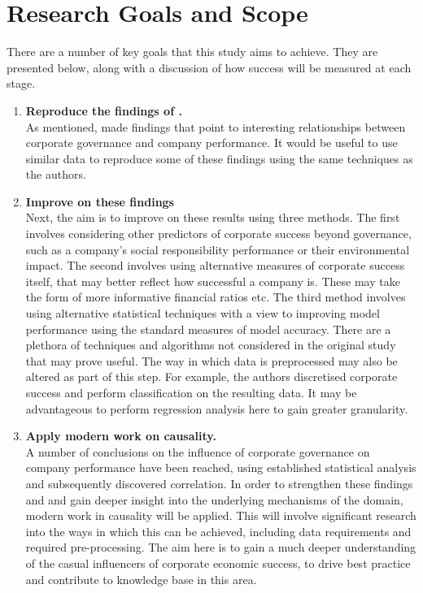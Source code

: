\section{Research Goals and Scope}{\label{RGAS}}
{There are a number of key goals that this study aims to achieve. They are presented below, along with a discussion of how success will be measured at each stage.
\begin{enumerate}
\item{\bf {Reproduce the findings of \cite{moldovan2015learning}}.}\\
{As mentioned, \cite{moldovan2015learning} made findings that point to interesting relationships between corporate governance and company performance. It would be useful to use similar data to reproduce some of these findings using the same techniques as the authors.}
\item{\bf {Improve on these findings}}\\
Next, the aim is to improve on these results using three methods. The first involves considering other predictors of corporate success beyond governance, such as a company's social responsibility performance or their environmental impact. The second involves using alternative measures of corporate success itself, that may better reflect how successful a company is. These may take the form of more informative financial ratios etc. The third method involves using alternative statistical techniques with a view to improving model performance using the standard measures of model accuracy. There are a plethora of techniques and algorithms not considered in the original study that may prove useful. The way in which data is preprocessed may also be altered as part of this step. For example, the authors discretised corporate success and perform classification on the resulting data. It may be advantageous to perform regression analysis here to gain greater granularity.
\item{\bf {Apply modern work on causality.}}\\
{A number of conclusions on the influence of corporate governance on company performance have been reached, using established statistical analysis and subsequently discovered correlation. In order to strengthen these findings and and gain deeper insight into the underlying mechanisms of the domain, modern work in causality will be applied. This will involve significant research into the ways in which this can be achieved, including data requirements and required pre-processing. The aim here is to gain a much deeper understanding of the casual influencers of corporate economic success, to drive best practice and contribute to knowledge base in this area. }

\end{enumerate}}
